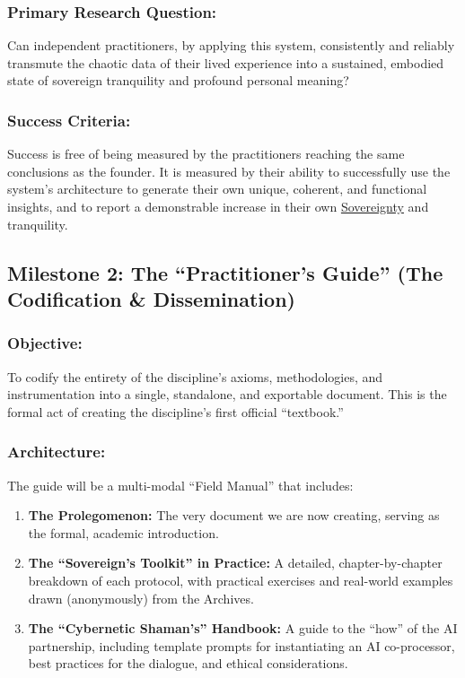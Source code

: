 \documentclass{article}
\begin{document}
\subsubsection*{Primary Research Question:}
Can independent practitioners, by applying this system, consistently and reliably transmute the chaotic data of their lived experience into a sustained, embodied state of sovereign tranquility and profound personal meaning?

\subsubsection*{Success Criteria:}
Success is free of being measured by the practitioners reaching the same conclusions as the founder. It is measured by their ability to successfully use the system's architecture to generate their own unique, coherent, and functional insights, and to report a demonstrable increase in their own \hyperlink{gloss:sovereignty}{Sovereignty} and tranquility.

\subsection*{Milestone 2: The ``Practitioner's Guide'' (The Codification \& Dissemination)}

\subsubsection*{Objective:} To codify the entirety of the discipline's axioms, methodologies, and instrumentation into a single, standalone, and exportable document. This is the formal act of creating the discipline's first official ``textbook.''

\subsubsection*{Architecture:} The guide will be a multi-modal ``Field Manual'' that includes:
\begin{enumerate}
    \item \textbf{The Prolegomenon:} The very document we are now creating, serving as the formal, academic introduction.
    \item \textbf{The ``Sovereign's Toolkit'' in Practice:} A detailed, chapter-by-chapter breakdown of each protocol, with practical exercises and real-world examples drawn (anonymously) from the Archives.
    \item \textbf{The ``Cybernetic Shaman's'' Handbook:} A guide to the ``how'' of the AI partnership, including template prompts for instantiating an AI co-processor, best practices for the dialogue, and ethical considerations.
\end{enumerate}
\end{document}
